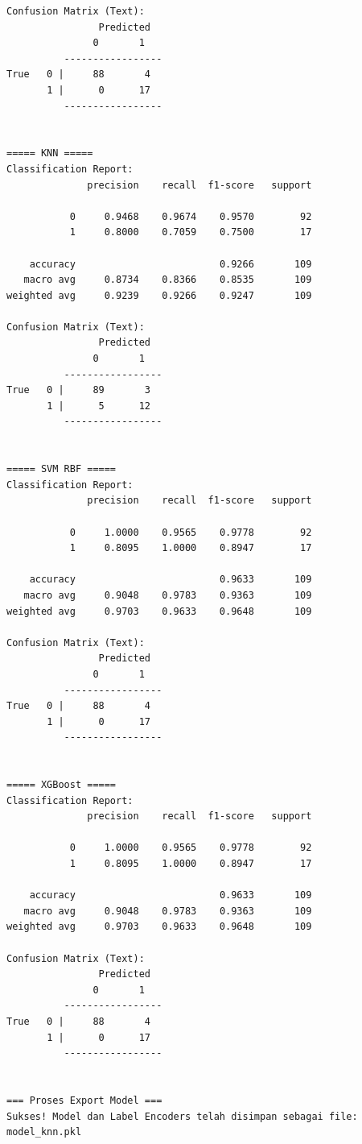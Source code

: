 \begin{lstlisting}[caption={Output 18}]
Confusion Matrix (Text):
                Predicted
               0       1
          -----------------
True   0 |     88       4
       1 |      0      17
          -----------------


===== KNN =====
Classification Report:
              precision    recall  f1-score   support

           0     0.9468    0.9674    0.9570        92
           1     0.8000    0.7059    0.7500        17

    accuracy                         0.9266       109
   macro avg     0.8734    0.8366    0.8535       109
weighted avg     0.9239    0.9266    0.9247       109

Confusion Matrix (Text):
                Predicted
               0       1
          -----------------
True   0 |     89       3
       1 |      5      12
          -----------------


===== SVM RBF =====
Classification Report:
              precision    recall  f1-score   support

           0     1.0000    0.9565    0.9778        92
           1     0.8095    1.0000    0.8947        17

    accuracy                         0.9633       109
   macro avg     0.9048    0.9783    0.9363       109
weighted avg     0.9703    0.9633    0.9648       109

Confusion Matrix (Text):
                Predicted
               0       1
          -----------------
True   0 |     88       4
       1 |      0      17
          -----------------


===== XGBoost =====
Classification Report:
              precision    recall  f1-score   support

           0     1.0000    0.9565    0.9778        92
           1     0.8095    1.0000    0.8947        17

    accuracy                         0.9633       109
   macro avg     0.9048    0.9783    0.9363       109
weighted avg     0.9703    0.9633    0.9648       109

Confusion Matrix (Text):
                Predicted
               0       1
          -----------------
True   0 |     88       4
       1 |      0      17
          -----------------


=== Proses Export Model ===
Sukses! Model dan Label Encoders telah disimpan sebagai file: model_knn.pkl
\end{lstlisting}

